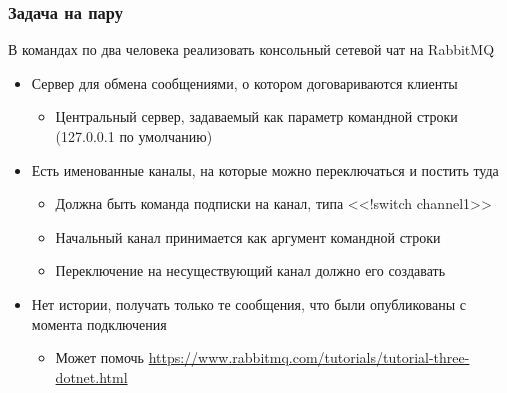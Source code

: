 \documentclass[xetex,mathserif,serif]{beamer}
\begin{document}
    \begin{frame}
        \frametitle{Задача на пару}
        В командах по два человека реализовать консольный сетевой чат на RabbitMQ
        \begin{itemize}
            \item Сервер для обмена сообщениями, о котором договариваются клиенты
            \begin{itemize}
                \item Центральный сервер, задаваемый как параметр командной строки (127.0.0.1 по умолчанию)
            \end{itemize}
            \item Есть именованные каналы, на которые можно переключаться и постить туда
            \begin{itemize}
                \item Должна быть команда подписки на канал, типа <<!switch channel1>>
                \item Начальный канал принимается как аргумент командной строки
                \item Переключение на несуществующий канал должно его создавать
            \end{itemize}
            \item Нет истории, получать только те сообщения, что были опубликованы с момента подключения
            \begin{itemize}
                \item Может помочь \url{https://www.rabbitmq.com/tutorials/tutorial-three-dotnet.html}
            \end{itemize}
        \end{itemize}
    \end{frame}
\end{document}
